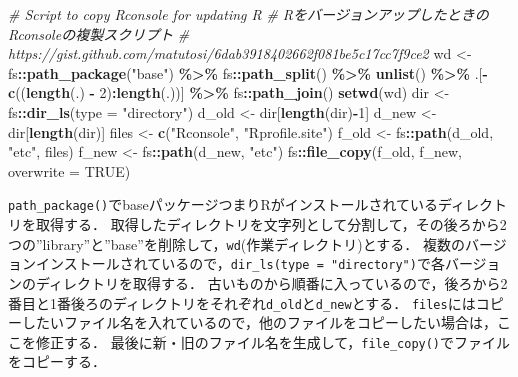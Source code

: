 \documentclass[
]{article}
\newenvironment{Shaded}{\begin{snugshade}}{\end{snugshade}}
\newcommand{\AttributeTok}[1]{\textcolor[rgb]{0.13,0.29,0.53}{#1}}
\newcommand{\CommentTok}[1]{\textcolor[rgb]{0.56,0.35,0.01}{\textit{#1}}}
\newcommand{\ConstantTok}[1]{\textcolor[rgb]{0.56,0.35,0.01}{#1}}
\newcommand{\DecValTok}[1]{\textcolor[rgb]{0.00,0.00,0.81}{#1}}
\newcommand{\FunctionTok}[1]{\textcolor[rgb]{0.13,0.29,0.53}{\textbf{#1}}}
\newcommand{\NormalTok}[1]{#1}
\newcommand{\OtherTok}[1]{\textcolor[rgb]{0.56,0.35,0.01}{#1}}
\newcommand{\SpecialCharTok}[1]{\textcolor[rgb]{0.81,0.36,0.00}{\textbf{#1}}}
\newcommand{\StringTok}[1]{\textcolor[rgb]{0.31,0.60,0.02}{#1}}
\begin{document}
\begin{Shaded}
\begin{Highlighting}[]
  \CommentTok{\# Script to copy Rconsole for updating R}
  \CommentTok{\# RをバージョンアップしたときのRconsoleの複製スクリプト}
  \CommentTok{\#   https://gist.github.com/matutosi/6dab3918402662f081be5c17cc7f9ce2}
\NormalTok{wd }\OtherTok{\textless{}{-}} 
\NormalTok{  fs}\SpecialCharTok{::}\FunctionTok{path\_package}\NormalTok{(}\StringTok{"base"}\NormalTok{) }\SpecialCharTok{\%\textgreater{}\%}
\NormalTok{  fs}\SpecialCharTok{::}\FunctionTok{path\_split}\NormalTok{() }\SpecialCharTok{\%\textgreater{}\%}
  \FunctionTok{unlist}\NormalTok{() }\SpecialCharTok{\%\textgreater{}\%}
\NormalTok{  .[}\SpecialCharTok{{-}}\FunctionTok{c}\NormalTok{((}\FunctionTok{length}\NormalTok{(.) }\SpecialCharTok{{-}} \DecValTok{2}\NormalTok{)}\SpecialCharTok{:}\FunctionTok{length}\NormalTok{(.))] }\SpecialCharTok{\%\textgreater{}\%}
\NormalTok{  fs}\SpecialCharTok{::}\FunctionTok{path\_join}\NormalTok{()  }
\FunctionTok{setwd}\NormalTok{(wd)}
\NormalTok{dir }\OtherTok{\textless{}{-}}\NormalTok{ fs}\SpecialCharTok{::}\FunctionTok{dir\_ls}\NormalTok{(}\AttributeTok{type =} \StringTok{"directory"}\NormalTok{)}
\NormalTok{d\_old }\OtherTok{\textless{}{-}}\NormalTok{ dir[}\FunctionTok{length}\NormalTok{(dir)}\SpecialCharTok{{-}}\DecValTok{1}\NormalTok{]}
\NormalTok{d\_new }\OtherTok{\textless{}{-}}\NormalTok{ dir[}\FunctionTok{length}\NormalTok{(dir)]}
\NormalTok{files }\OtherTok{\textless{}{-}} \FunctionTok{c}\NormalTok{(}\StringTok{"Rconsole"}\NormalTok{, }\StringTok{"Rprofile.site"}\NormalTok{)}
\NormalTok{f\_old }\OtherTok{\textless{}{-}}\NormalTok{ fs}\SpecialCharTok{::}\FunctionTok{path}\NormalTok{(d\_old, }\StringTok{"etc"}\NormalTok{, files)}
\NormalTok{f\_new }\OtherTok{\textless{}{-}}\NormalTok{ fs}\SpecialCharTok{::}\FunctionTok{path}\NormalTok{(d\_new, }\StringTok{"etc"}\NormalTok{)}
\NormalTok{fs}\SpecialCharTok{::}\FunctionTok{file\_copy}\NormalTok{(f\_old, f\_new, }\AttributeTok{overwrite =} \ConstantTok{TRUE}\NormalTok{)}
\end{Highlighting}
\end{Shaded}

\texttt{path\_package()}でbaseパッケージつまりRがインストールされているディレクトリを取得する．
取得したディレクトリを文字列として分割して，その後ろから2つの''library''と''base''を削除して，\texttt{wd}(作業ディレクトリ)とする．
複数のバージョンインストールされているので，\texttt{dir\_ls(type\ =\ "directory")}で各バージョンのディレクトリを取得する．
古いものから順番に入っているので，後ろから2番目と1番後ろのディレクトリをそれぞれ\texttt{d\_old}と\texttt{d\_new}とする．
\texttt{files}にはコピーしたいファイル名を入れているので，他のファイルをコピーしたい場合は，ここを修正する．
最後に新・旧のファイル名を生成して，\texttt{file\_copy()}でファイルをコピーする．
\end{document}
